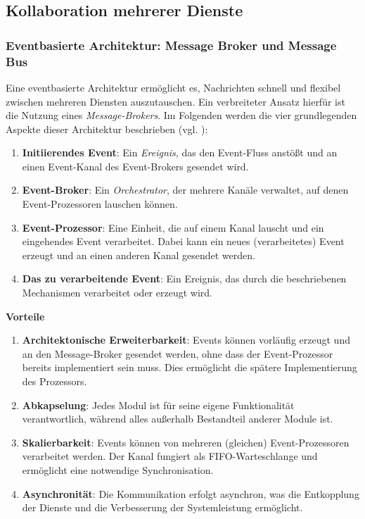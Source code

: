 \subsection{Kollaboration mehrerer Dienste}

\subsubsection{Eventbasierte Architektur: Message Broker und Message Bus}

Eine eventbasierte Architektur ermöglicht es, Nachrichten schnell und flexibel zwischen mehreren Diensten auszutauschen. Ein verbreiteter Ansatz hierfür ist die Nutzung eines \textit{Message-Brokers}. Im Folgenden werden die vier grundlegenden Aspekte dieser Architektur beschrieben (vgl. \autocite{oreilly:mod-swarch}):
\begin{enumerate}
    \item \textbf{Initiierendes Event}: Ein \textit{Ereignis}, das den Event-Fluss anstößt und an einen Event-Kanal des Event-Brokers gesendet wird.
    \item \textbf{Event-Broker}: Ein \textit{Orchestrator}, der mehrere Kanäle verwaltet, auf denen Event-Prozessoren lauschen können.
    \item \textbf{Event-Prozessor}: Eine Einheit, die auf einem Kanal lauscht und ein eingehendes Event verarbeitet. Dabei kann ein neues (verarbeitetes) Event erzeugt und an einen anderen Kanal gesendet werden.
    \item \textbf{Das zu verarbeitende Event}: Ein Ereignis, das durch die beschriebenen Mechanismen verarbeitet oder erzeugt wird.
\end{enumerate}

\textbf{Vorteile}

\begin{enumerate}
    \item \textbf{Architektonische Erweiterbarkeit}: Events können vorläufig erzeugt und an den Message-Broker gesendet werden, ohne dass der Event-Prozessor bereits implementiert sein muss. Dies ermöglicht die spätere Implementierung des Prozessors.
    \item \textbf{Abkapselung}: Jedes Modul ist für seine eigene Funktionalität verantwortlich, während alles außerhalb Bestandteil anderer Module ist.
    \item \textbf{Skalierbarkeit}: Events können von mehreren (gleichen) Event-Prozessoren verarbeitet werden. Der Kanal fungiert als FIFO-Warteschlange und ermöglicht eine notwendige Synchronisation.
    \item \textbf{Asynchronität}: Die Kommunikation erfolgt asynchron, was die Entkopplung der Dienste und die Verbesserung der Systemleistung ermöglicht.
\end{enumerate}

